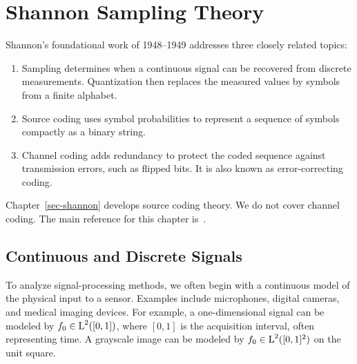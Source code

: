 
\chapter{Shannon Sampling Theory}
\label{sec-shannon-sampling}


%
Shannon's foundational work of 1948--1949 addresses three closely related topics:
\begin{enumerate}
	\item Sampling determines when a continuous signal can be recovered from discrete measurements. Quantization then replaces the measured values by symbols from a finite alphabet.
	\item Source coding uses symbol probabilities to represent a sequence of symbols compactly as a binary string.
	\item Channel coding adds redundancy to protect the coded sequence against transmission errors, such as flipped bits. It is also known as error-correcting coding.
\end{enumerate}
%
Chapter~\ref{sec-shannon} develops source coding theory. We do not cover channel coding.
%
The main reference for this chapter is~\cite{mallat2008wavelet}.


\section{Continuous and Discrete Signals}

To analyze signal-processing methods, we often begin with a continuous model of the physical input to a sensor.
%
Examples include microphones, digital cameras, and medical imaging devices.
%
For example, a one-dimensional signal can be modeled by $f_0\in\text{\upshape L}^2([0,1])$, where $[0,1]$ is the acquisition interval, often representing time. A grayscale image can be modeled by $f_0\in\text{\upshape L}^2([0,1]^2)$ on the unit square.

